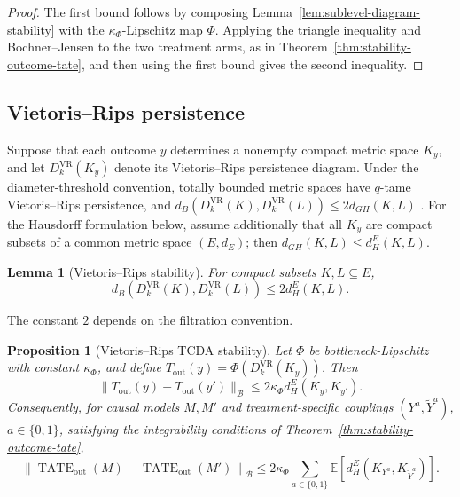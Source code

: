 \documentclass[11pt,a4paper]{article}
\theoremstyle{plain}
\newtheorem{proposition}[theorem]{Proposition}
\newtheorem{lemma}[theorem]{Lemma}
\theoremstyle{definition}
\theoremstyle{remark}
\newcommand{\1}{\mathbbm{1}}
\begin{document}
\begin{proof}
The first bound follows by composing
Lemma~\ref{lem:sublevel-diagram-stability} with the
\(\kappa_\Phi\)-Lipschitz map \(\Phi\). Applying the triangle
inequality and Bochner--Jensen to the two treatment arms, as in Theorem~\ref{thm:stability-outcome-tate}, and then using the first bound gives the second inequality.
\end{proof}


\subsection{Vietoris--Rips persistence}
\label{subsec:vr-stability}

Suppose that each outcome \(y\) determines a nonempty compact
metric space \(K_y\), and let \(D_k^{\mathrm{VR}}(K_y)\) denote its Vietoris--Rips persistence diagram. Under the diameter-threshold convention, totally bounded metric spaces have \(q\)-tame Vietoris--Rips persistence, and
\(d_B\left( D_k^{\mathrm{VR}}(K), D_k^{\mathrm{VR}}(L) \right) \leq 2d_{GH}(K,L)\) \citep{chazaldesilvaoudot2014}. For the Hausdorff formulation
below, assume additionally that all \(K_y\) are compact subsets of a common metric space \((E,d_E)\); then
\(d_{GH}(K,L)\leq d_H^E(K,L)\).

\begin{lemma}[Vietoris--Rips stability]
\label{lem:vr-stability}
For compact subsets \(K,L\subseteq E\),
\[
d_B\left(
D_k^{\mathrm{VR}}(K),
D_k^{\mathrm{VR}}(L)
\right)
\leq
2d_H^E(K,L).
\]
\end{lemma}

The constant \(2\) depends on the filtration convention.

\begin{proposition}[Vietoris--Rips TCDA stability]
\label{prop:vr-causal-stability}
Let \(\Phi\) be bottleneck-Lipschitz with constant \(\kappa_\Phi\), and define
\(T_{\mathrm{out}}(y) = \Phi(D_k^{\mathrm{VR}}(K_y))\). Then
\[
\|T_{\mathrm{out}}(y)-T_{\mathrm{out}}(y')\|_{\mathcal B}
\leq
2\kappa_\Phi d_H^E(K_y,K_{y'}).
\]
Consequently, for causal models \(M,M'\) and
treatment-specific couplings
\((Y^a,\widetilde Y^a)\), \(a\in\{0,1\}\), satisfying the
integrability conditions of
Theorem~\ref{thm:stability-outcome-tate},
\[
\left\|
\operatorname{TATE}_{\mathrm{out}}(M)
-
\operatorname{TATE}_{\mathrm{out}}(M')
\right\|_{\mathcal B}
\leq
2\kappa_\Phi
\sum_{a\in\{0,1\}}
\mathbb E[
d_H^E(K_{Y^a},K_{\widetilde Y^a})
].
\]
\end{proposition}
\end{document}
